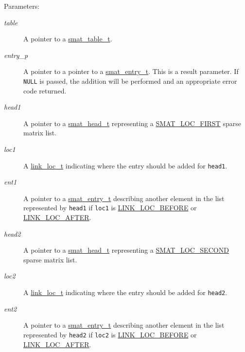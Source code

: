 \begin{Desc}
\item[Parameters:]
\begin{description}
\item[{\em table}]A pointer to a \hyperlink{group__dbprim__smat_a0}{smat\_\-table\_\-t}. \item[{\em entry\_\-p}]A pointer to a pointer to a \hyperlink{group__dbprim__smat_a2}{smat\_\-entry\_\-t}. This is a result parameter. If {\tt NULL} is passed, the addition will be performed and an appropriate error code returned. \item[{\em head1}]A pointer to a \hyperlink{group__dbprim__smat_a1}{smat\_\-head\_\-t} representing a \hyperlink{group__dbprim__smat_a47a135}{SMAT\_\-LOC\_\-FIRST} sparse matrix list. \item[{\em loc1}]A \hyperlink{group__dbprim__link_a4}{link\_\-loc\_\-t} indicating where the entry should be added for {\tt head1}. \item[{\em ent1}]A pointer to a \hyperlink{group__dbprim__smat_a2}{smat\_\-entry\_\-t} describing another element in the list represented by {\tt head1} if {\tt loc1} is \hyperlink{group__dbprim__link_a26a133}{LINK\_\-LOC\_\-BEFORE} or \hyperlink{group__dbprim__link_a26a134}{LINK\_\-LOC\_\-AFTER}. \item[{\em head2}]A pointer to a \hyperlink{group__dbprim__smat_a1}{smat\_\-head\_\-t} representing a \hyperlink{group__dbprim__smat_a47a136}{SMAT\_\-LOC\_\-SECOND} sparse matrix list. \item[{\em loc2}]A \hyperlink{group__dbprim__link_a4}{link\_\-loc\_\-t} indicating where the entry should be added for {\tt head2}. \item[{\em ent2}]A pointer to a \hyperlink{group__dbprim__smat_a2}{smat\_\-entry\_\-t} describing another element in the list represented by {\tt head2} if {\tt loc2} is \hyperlink{group__dbprim__link_a26a133}{LINK\_\-LOC\_\-BEFORE} or \hyperlink{group__dbprim__link_a26a134}{LINK\_\-LOC\_\-AFTER}.\end{description}
\end{Desc}

